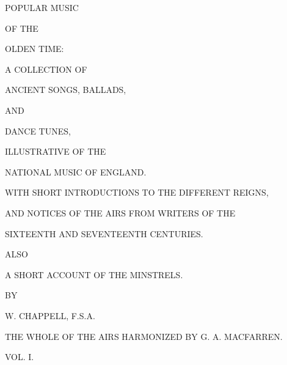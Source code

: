 \frontmatter


\thispagestyle{empty}
\begin{center}


\Huge POPUL\hspace{1pt}AR MUSIC
\titlespace

\small OF THE

\titlespace

\Huge OLDEN TIME:

\titlespace

\small A COLLECTION OF

\titlespace

\huge ANCIENT SONGS, BALL\hspace{1pt}ADS,

\titlespace

\small AND

\titlespace

\huge DANCE TUNES,

\titlespace

\small ILLUSTRATIVE OF THE

\titlespace

\huge NATIONAL MUSIC OF ENGL\hspace{1pt}AND.

\titlespace

\normalsize WITH SHORT INTRODUCTIONS TO THE DIFFERENT REIGNS,

AND NOTICES OF THE AIRS FROM WRITERS OF THE

SIXTEENTH AND SEVENTEENTH CENTURIES.

\titlespace

\small ALSO

\titlespace

\large A SHORT ACCOUNT OF THE MINSTRELS.

\titlespace

\small BY

\titlespace

\Large W. CHAPPELL, F.S.A.

\titlespace

\normalsize THE WHOLE OF THE AIRS HARMONIZED BY G. A. MACFARREN.

\titlespace

\large VOL. I.

\titlespace


\end{center}
